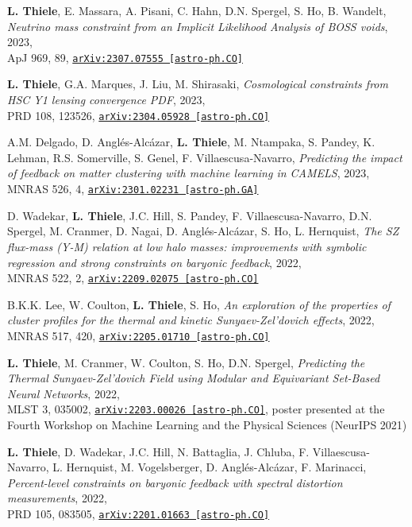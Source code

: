 \newpage
\vspace*{0.5cm}

{\bf L. Thiele}, E. Massara, A. Pisani, C. Hahn, D.N. Spergel, S. Ho, B. Wandelt,
\emph{Neutrino mass constraint from an Implicit Likelihood Analysis of BOSS voids}, 2023,\\
ApJ 969, 89,
\href{https://arxiv.org/abs/2307.07555}{\mbox{\texttt{arXiv:2307.07555 [astro-ph.CO]}}}

{\bf L. Thiele}, G.A. Marques, J. Liu, M. Shirasaki,
\emph{Cosmological constraints from HSC Y1 lensing convergence PDF}, 2023,\\
PRD 108, 123526,
\href{https://arxiv.org/abs/2304.05928}{\mbox{\texttt{arXiv:2304.05928 [astro-ph.CO]}}}

A.M. Delgado, D. Angl\'es-Alc\'azar, {\bf L. Thiele}, M. Ntampaka, S. Pandey,
K. Lehman, R.S. Somerville, S. Genel, F. Villaescusa-Navarro,
\emph{Predicting the impact of feedback on matter clustering with machine learning
      in CAMELS}, 2023,\\
MNRAS 526, 4,
\href{https://arxiv.org/abs/2301.02231}{\mbox{\texttt{arXiv:2301.02231 [astro-ph.GA]}}}

D. Wadekar, {\bf L. Thiele}, J.C. Hill, S. Pandey, F. Villaescusa-Navarro,
D.N. Spergel, M. Cranmer, D. Nagai, D. Angl\'es-Alc\'azar, S. Ho, L. Hernquist,
\emph{The SZ flux-mass (Y-M) relation at low halo masses: improvements with
      symbolic regression and strong constraints on baryonic feedback}, 2022,\\
MNRAS 522, 2,
\href{https://arxiv.org/abs/2209.02075}{\mbox{\texttt{arXiv:2209.02075 [astro-ph.CO]}}}

B.K.K. Lee, W. Coulton, {\bf L. Thiele}, S. Ho,
\emph{An exploration of the properties of cluster profiles for the thermal
      and kinetic Sunyaev-Zel'dovich effects}, 2022,\\
MNRAS 517, 420,
\href{https://arxiv.org/abs/2205.01710}{\mbox{\texttt{arXiv:2205.01710 [astro-ph.CO]}}}

{\bf L. Thiele}, M. Cranmer, W. Coulton, S. Ho, D.N. Spergel,
\emph{Predicting the Thermal Sunyaev-Zel'dovich Field
      using Modular and Equivariant Set-Based Neural Networks}, 2022,\\
MLST 3, 035002,
\href{https://arxiv.org/abs/2203.00026}{\mbox{\texttt{arXiv:2203.00026 [astro-ph.CO]}}},
poster presented at the Fourth Workshop on Machine Learning and the Physical Sciences (NeurIPS 2021)

{\bf L. Thiele}, D. Wadekar, J.C. Hill, N. Battaglia, J. Chluba,
F. Villaescusa-Navarro, L. Hernquist, M. Vogelsberger, D. Angl\'es-Alc\'azar,
F. Marinacci,
\emph{Percent-level constraints on baryonic feedback with spectral distortion
      measurements}, 2022,\\
PRD 105, 083505,
\href{https://arxiv.org/abs/2201.01663}{\mbox{\texttt{arXiv:2201.01663 [astro-ph.CO]}}}

